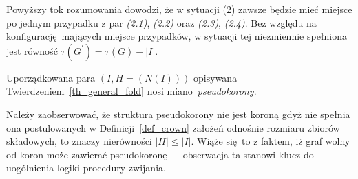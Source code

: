 {\begin{bproof}
\begin{itemize}
      Powyższy tok rozumowania dowodzi, że w sytuacji (2) zawsze będzie mieć miejsce po jednym przypadku z par \textit{(2.1)}, \textit{(2.2)} oraz \textit{(2.3)}, \textit{(2.4)}.
      Bez względu na konfigurację mających miejsce przypadków, w sytuacji tej niezmiennie spełniona jest równość $\tau(G^\prime)=\tau(G)-|I|$.
    \end{itemize}
  \end{bproof}

  \begin{definition}
    Uporządkowana para $(I, H=(N(I)))$ opisywana Twierdzeniem~\ref{th_general_fold} nosi miano~\emph{pseudokorony}.
  \end{definition}

  Należy zaobserwować, że struktura pseudokorony nie jest koroną gdyż nie spełnia ona postulowanych w Definicji~\ref{def_crown} założeń odnośnie rozmiaru zbiorów składowych, to znaczy nierówności $|H| \leq |I|$.
  Wiąże się to z faktem, iż graf wolny od koron może zawierać pseudokoronę --- obserwacja ta stanowi klucz do uogólnienia logiki procedury zwijania.
}
